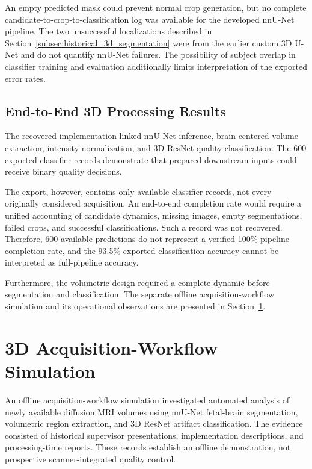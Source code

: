 An empty predicted mask could prevent normal crop generation, but no complete candidate-to-crop-to-classification log was available for the developed nnU-Net pipeline. The two unsuccessful localizations described in Section~\ref{subsec:historical_3d_segmentation} were from the earlier custom 3D U-Net and do not quantify nnU-Net failures. The possibility of subject overlap in classifier training and evaluation additionally limits interpretation of the exported error rates.

\subsection{End-to-End 3D Processing Results}
\label{subsec:results_3d_pipeline_completion}

The recovered implementation linked nnU-Net inference, brain-centered volume extraction, intensity normalization, and 3D ResNet quality classification. The 600 exported classifier records demonstrate that prepared downstream inputs could receive binary quality decisions.

The export, however, contains only available classifier records, not every originally considered acquisition. An end-to-end completion rate would require a unified accounting of candidate dynamics, missing images, empty segmentations, failed crops, and successful classifications. Such a record was not recovered. Therefore, 600 available predictions do not represent a verified 100\% pipeline completion rate, and the 93.5\% exported classification accuracy cannot be interpreted as full-pipeline accuracy.

Furthermore, the volumetric design required a complete dynamic before segmentation and classification. The separate offline acquisition-workflow simulation and its operational observations are presented in Section~\ref{sec:results_3d_end_to_end}.

\section{3D Acquisition-Workflow Simulation}
\label{sec:results_3d_end_to_end}

An offline acquisition-workflow simulation investigated automated analysis of newly available diffusion MRI volumes using nnU-Net fetal-brain segmentation, volumetric region extraction, and 3D ResNet artifact classification. The evidence consisted of historical supervisor presentations, implementation descriptions, and processing-time reports. These records establish an offline demonstration, not prospective scanner-integrated quality control.

